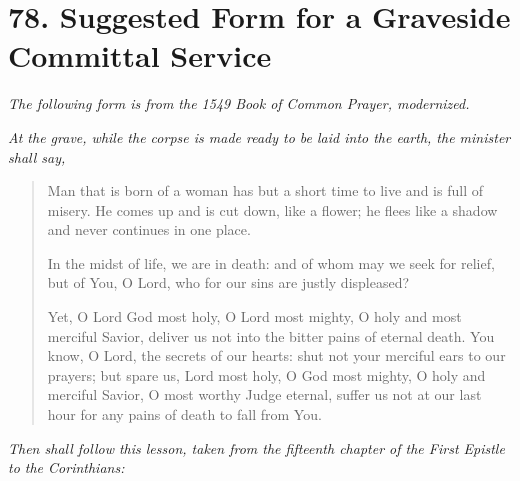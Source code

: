 \documentclass[
]{book}
\begin{document}
\hypertarget{suggested-form-for-a-graveside-committal-service}{%
\section*{78. Suggested Form for a Graveside Committal Service}\label{suggested-form-for-a-graveside-committal-service}}

\protect\hypertarget{chapter-slug-78-suggested-form-for-a-graveside-committal-service}{\href{}{}}

\protect\hypertarget{78}{\href{}{}}\emph{The following form is from the 1549 Book of Common Prayer, modernized.}

\begin{center}
\emph{At the grave, while the corpse is made ready to be laid into the earth, the minister shall say,}

\end{center}

\begin{quote}
Man that is born of a woman has but a short time to live and is full of misery. He comes up and is cut down, like a flower; he flees like a shadow and never continues in one place.

In the midst of life, we are in death: and of whom may we seek for relief, but of You, O Lord, who for our sins are justly displeased?

Yet, O Lord God most holy, O Lord most mighty, O holy and most merciful Savior, deliver us not into the bitter pains of eternal death. You know, O Lord, the secrets of our hearts: shut not your merciful ears to our prayers; but spare us, Lord most holy, O God most mighty, O holy and merciful Savior, O most worthy Judge eternal, suffer us not at our last hour for any pains of death to fall from You.
\end{quote}

\begin{center}
\emph{Then shall follow this lesson, taken from the fifteenth chapter of the First Epistle to the Corinthians:}

\end{center}
\end{document}

